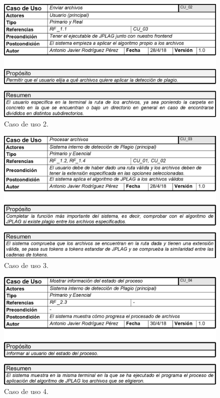 \begin{figure}[H] %
\centering
\includegraphics[scale=0.5]{imagenes/CU_02.png}  %
\caption{Caso de uso 2.} \label{fig:CU2}
\end{figure}

\begin{figure}[H] %
\centering
\includegraphics[scale=0.5]{imagenes/CU_03.png}  %
\caption{Caso de uso 3.} \label{fig:CU3}
\end{figure}

\begin{figure}[H] %
\centering
\includegraphics[scale=0.5]{imagenes/CU_04.png}  %
\caption{Caso de uso 4.} \label{fig:CU4}
\end{figure}

